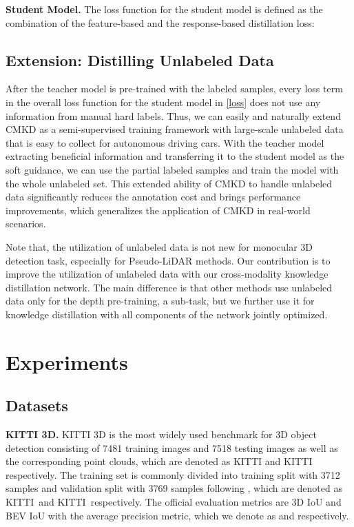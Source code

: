 \documentclass[runningheads]{llncs}
\begin{document}
\noindent\textbf{Student Model.}
The loss function for the student model is defined as the combination of the feature-based and the response-based distillation loss:



\subsection{Extension: Distilling Unlabeled Data}
\label{extend}
After the teacher model is pre-trained with the labeled samples, every loss term in the overall loss function for the student model  in \cref{loss} does not use any information from manual hard labels.
Thus, we can easily and naturally extend CMKD as a semi-supervised training framework with large-scale unlabeled data that is easy to collect for autonomous driving cars. 
With the teacher model extracting beneficial information and transferring it to the student model as the soft guidance, we can use the partial labeled samples and train the model with the whole unlabeled set.
This extended ability of CMKD to handle unlabeled data significantly reduces the annotation cost and brings performance improvements, which generalizes the application of CMKD in real-world scenarios.

Note that, the utilization of unlabeled data is not new for monocular 3D detection task, especially for Pseudo-LiDAR methods.
Our contribution is to improve the utilization of unlabeled data with our cross-modality knowledge distillation network. 
The main difference is that other methods use unlabeled data only for the depth pre-training, a sub-task, but we further use it for knowledge distillation with all components of the network jointly optimized.



\section{Experiments}

\subsection{Datasets}

\textbf{KITTI 3D.}
KITTI 3D \cite{KITTI} is the most widely used benchmark for 3D object detection consisting of 7481 training images and 7518 testing images as well as the corresponding point clouds, which are denoted as KITTI  and KITTI  respectively.
The training set is commonly divided into training split with 3712 samples and validation split with 3769 samples following \cite{kittisplit}, which are denoted as KITTI\, and KITTI\, respectively.
The official evaluation metrics are 3D IoU and BEV IoU with the average precision metric, which we denote as  and  respectively.
\end{document}
